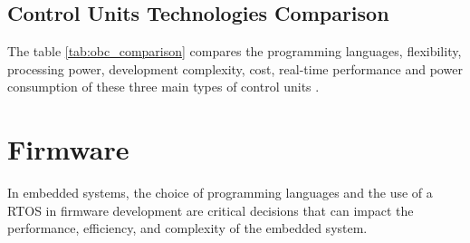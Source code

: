 \subsection{Control Units Technologies Comparison}
The table \ref{tab:obc_comparison} compares the programming languages, flexibility, processing power, development complexity, cost, real-time performance and power consumption of these three main types of control units \cite{OBC5}.
\begin{table}[H]
    \centering
    \caption{Comparison of Microcontrollers, Microprocessors, and FPGAs.}
    \label{tab:obc_comparison}
\end{table}

\section{Firmware}
In embedded systems, the choice of programming languages and the use of a \gls{RTOS} in firmware development are critical decisions that can impact the performance, efficiency, and complexity of the embedded system.

